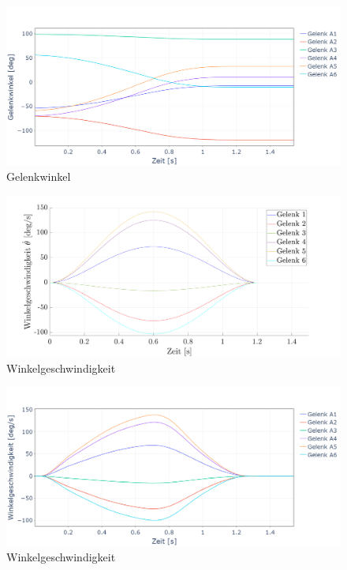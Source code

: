 %
\begin{figure}[]
	\centering
	\includegraphics[width=1\linewidth]{images/gelenkwinkel_py}
	\caption{Gelenkwinkel}
	\label{fig:gelenkwinkelpy}
\end{figure}
%
\newpage
\begin{figure}[]
	\centering
	\includegraphics[width=1\linewidth]{images/winkelgeschwindigkeit}
	\caption{Winkelgeschwindigkeit}
	\label{fig:winkelgeschwindigkeit}
\end{figure}
%
\begin{figure}[]
	\centering
	\includegraphics[width=1\linewidth]{images/winkelgeschwindigkeit_py}
	\caption{Winkelgeschwindigkeit}
	\label{fig:winkelgeschwindigkeit_py1}
\end{figure}
